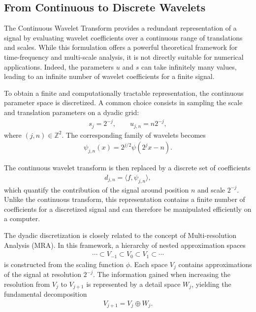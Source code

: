 \subsection{From Continuous to Discrete Wavelets}

The Continuous Wavelet Transform provides a redundant representation of a signal by evaluating wavelet coefficients over a continuous range of translations and scales. While this formulation offers a powerful theoretical framework for time-frequency and multi-scale analysis, it is not directly suitable for numerical applications. Indeed, the parameters $u$ and $s$ can take infinitely many values, leading to an infinite number of wavelet coefficients for a finite signal.

To obtain a finite and computationally tractable representation, the continuous parameter space is discretized. A common choice consists in sampling the scale and translation parameters on a dyadic grid:
\begin{align}
s_j = 2^{-j},
\qquad
u_{j,n} = n 2^{-j},
\end{align}
where $(j,n) \in \mathbb{Z}^2$. The corresponding family of wavelets becomes
\begin{align}
\psi_{j,n}(x)
=
2^{j/2}
\psi\!\left(2^j x - n\right).
\end{align}

The continuous wavelet transform is then replaced by a discrete set of coefficients
\begin{align}
d_{j,n}
=
\langle f,\psi_{j,n}\rangle,
\end{align}
which quantify the contribution of the signal around position $n$ and scale $2^{-j}$. Unlike the continuous transform, this representation contains a finite number of coefficients for a discretized signal and can therefore be manipulated efficiently on a computer.

The dyadic discretization is closely related to the concept of Multi-resolution Analysis (MRA). In this framework, a hierarchy of nested approximation spaces
\begin{align}
\cdots \subset V_{-1}
\subset V_0
\subset V_1
\subset \cdots
\end{align}
is constructed from the scaling function $\phi$. Each space $V_j$ contains approximations of the signal at resolution $2^{-j}$. The information gained when increasing the resolution from $V_j$ to $V_{j+1}$ is represented by a detail space $W_j$, yielding the fundamental decomposition
\begin{align}
V_{j+1}
=
V_j \oplus W_j.
\end{align}

